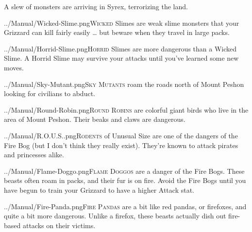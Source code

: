 \documentclass[10pt,twocolumn,openany,article]{memoir}
\begin{document}
A slew of monsters are arriving in Syrex, terrorizing the land.

\vspace{14pt}

\lettrine[image=true,                lines=5,               findent=3pt,
nindent=3pt]{../Manual/Wicked-Slime.png}{Wicked}  Slimes are  weak slime
monsters that  your Grizzard can  kill fairly  easily … but  beware when
they travel in large packs.

\vspace{14pt}

\lettrine[image=true,                lines=5,               findent=3pt,
nindent=3pt]{../Manual/Horrid-Slime.png}{Horrid}    Slimes   are    more
dangerous than a  Wicked Slime. A Horrid Slime may  survive your attacks
until you've learned some new moves.

\vspace{14pt}

\lettrine[image=true,                lines=5,               findent=3pt,
nindent=3pt]{../Manual/Sky-Mutant.png}{Sky Mutants} roam the roads north
of Mount Peshon  looking for civilians to abduct.

\vspace{14pt}

\lettrine[image=true,                lines=5,               findent=3pt,
nindent=3pt]{../Manual/Round-Robin.png}{Round Robins} are colorful giant
birds who live  in the area of  Mount Peshon. Their beaks  and claws are
dangerous.

\ifdefined\ATARIAGESAVE\pagebreak\else
\vspace{14pt}
\fi

\lettrine[image=true,                lines=5,               findent=3pt,
nindent=3pt]{../Manual/R.O.U.S..png}{Rodents} of Unusual Size are one of
the  dangers of  the Fire  Bog (but  I don't  think they  really exist).
They're known to attack pirates and princesses alike.

\vspace{14pt}

\lettrine[image=true,                lines=5,               findent=3pt,
nindent=3pt]{../Manual/Flame-Doggo.png}{Flame  Doggos} are  a danger  of
the Fire  Bogs. These beasts  often roam in packs,  and their fur  is on
fire. Avoid the Fire Bogs until you have begun to train your Grizzard to
have a higher Attack stat.

\vspace{14pt}

\lettrine[image=true,                lines=5,               findent=3pt,
nindent=3pt]{../Manual/Fire-Panda.png}{Fire Pandas}  are a bit  like red
pandas, or firefoxes, and quite a  bit more dangerous. Unlike a firefox,
these beasts actually dish out fire-based attacks on their victims.
\end{document}
